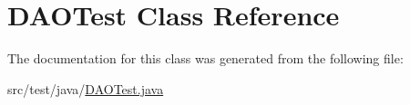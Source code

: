 \hypertarget{class_d_a_o_test}{}\section{D\+A\+O\+Test Class Reference}
\label{class_d_a_o_test}


The documentation for this class was generated from the following file\+:\begin{DoxyCompactItemize}
\item 
src/test/java/\mbox{\hyperlink{_d_a_o_test_8java}{D\+A\+O\+Test.\+java}}\end{DoxyCompactItemize}
